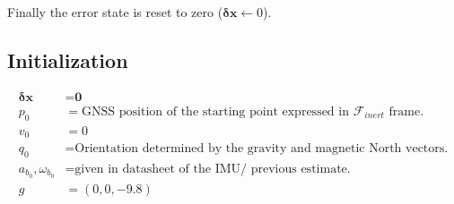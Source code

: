 \documentclass{article}
\begin{document}
Finally the error state is reset to zero ($\boldsymbol{\delta x}\xleftarrow{}0$).

\subsection{Initialization}
\begin{align}
    \boldsymbol{\delta x} &= \textbf{0} \\
    p_0 &= \text{GNSS position of the starting point expressed in $\mathcal{F}_{inert}$ frame.} \\
    v_0 &= 0 \\
    q_0 &= \text{Orientation determined by the gravity and magnetic North vectors.} \\
    a_{b_0},\omega_{b_0} &= \text{given in datasheet of the IMU/ previous estimate.} \\
    g &= \left(0,0,-9.8\right)
\end{align}{}
\end{document}

